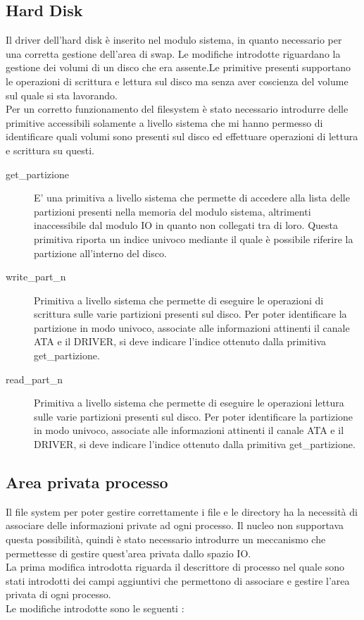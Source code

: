  \subsection{Hard Disk}
 Il driver dell'hard disk è inserito nel modulo sistema, in quanto necessario per una corretta gestione dell'area di swap. Le modifiche introdotte riguardano la gestione dei volumi di un disco che era assente.Le primitive presenti supportano le operazioni di scrittura e lettura sul disco ma senza aver coscienza del volume sul quale si sta lavorando.\\
 Per un corretto funzionamento del filesystem è stato necessario introdurre delle primitive accessibili solamente a livello sistema che mi hanno permesso di identificare quali volumi sono presenti sul disco ed effettuare operazioni di lettura e scrittura su questi. 
  \begin{description}
   \item[get\_partizione]
   E' una primitiva a livello sistema che permette di accedere alla lista delle partizioni presenti nella memoria del modulo sistema, altrimenti inaccessibile dal modulo IO in quanto  
   non collegati tra di loro. Questa primitiva riporta un indice univoco mediante il quale è possibile riferire la partizione all'interno del disco.
   \end{description}
  \begin{description}
   \item[write\_part\_n]
    Primitiva a livello sistema che permette di eseguire le operazioni di scrittura sulle varie partizioni presenti sul disco.
    Per poter identificare la partizione in modo univoco, associate alle informazioni attinenti il canale ATA e il DRIVER, si deve indicare l'indice
    ottenuto dalla primitiva get\_partizione.
  \end{description}
   \begin{description}
   \item[read\_part\_n]
    Primitiva a livello sistema che permette di eseguire le operazioni lettura sulle varie partizioni presenti sul disco.
    Per poter identificare la partizione in modo univoco, associate alle informazioni attinenti il canale ATA e il DRIVER, si deve indicare l'indice
    ottenuto dalla primitiva get\_partizione.
  \end{description}
  \subsection{Area privata processo}
  \label{AreaPrivataProcesso}
  Il file system per poter gestire correttamente i file e le directory ha la necessità di associare delle informazioni private ad ogni processo. Il nucleo non supportava questa possibilità, quindi è stato necessario introdurre un meccanismo che permettesse di gestire quest'area privata dallo spazio IO.\\
  La prima modifica introdotta riguarda il descrittore di processo nel quale sono stati introdotti dei campi aggiuntivi che permettono di associare e gestire l'area privata di ogni processo.\\
  Le modifiche introdotte sono le seguenti : \\
  
